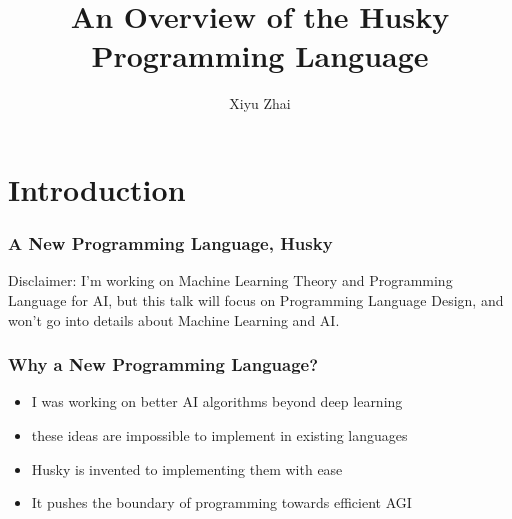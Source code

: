 \documentclass{beamer}   	%
\title{An Overview of the Husky Programming Language}
\author{Xiyu Zhai}
\date{}							%
\theoremstyle{definition}
\begin{document}
\maketitle

\section{Introduction}

\begin{frame}
\frametitle{A New Programming Language, Husky}

Disclaimer: I'm working on Machine Learning Theory and Programming Language for AI, but this talk will focus on Programming Language Design, and won't go into details about Machine Learning and AI.
\end{frame}

\begin{frame}
\frametitle{Why a New Programming Language?}
\begin{itemize}
	\item I was working on better AI algorithms beyond deep learning
	\item these ideas are impossible to implement in existing languages
	\item Husky is invented to implementing them with ease
	\item It pushes the boundary of programming towards efficient AGI
\end{itemize}
\begin{center}
\end{center}
\end{frame}
\end{document}
